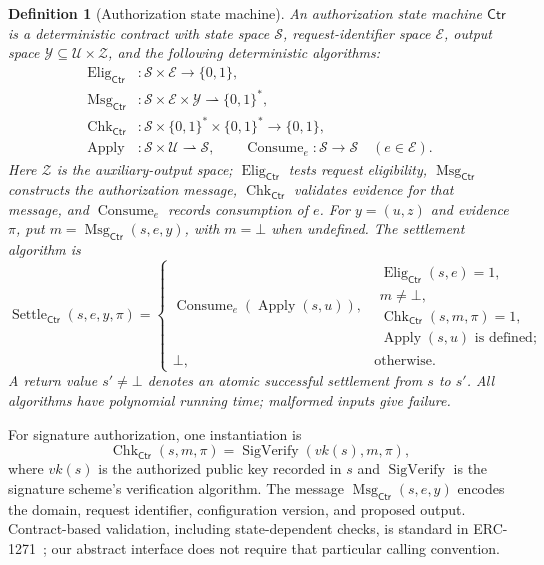 \documentclass[10pt,letterpaper]{article}
\newtheorem{definition}{Definition}
\newcommand{\Msg}{\operatorname{Msg}}
\newcommand{\Ctr}{\mathsf{Ctr}}
\begin{document}
\begin{definition}[Authorization state machine]
\label{def:auth-machine}
An authorization state machine $\Ctr$ is a deterministic contract with state space $\mathcal S$, request-identifier space $\mathcal E$, output space $\mathcal Y\subseteq\mathcal U\times\mathcal Z$, and the following deterministic algorithms:
\begin{align*}
 \operatorname{Elig}_{\Ctr}&:\mathcal S\times\mathcal E\to\{0,1\},\\
 \Msg_{\Ctr}&:\mathcal S\times\mathcal E\times\mathcal Y\rightharpoonup\{0,1\}^*,\\
 \operatorname{Chk}_{\Ctr}&:\mathcal S\times\{0,1\}^*\times\{0,1\}^*\to\{0,1\},\\
 \operatorname{Apply}&:\mathcal S\times\mathcal U\rightharpoonup\mathcal S,\qquad
 \operatorname{Consume}_e:\mathcal S\to\mathcal S\quad(e\in\mathcal E).
\end{align*}
Here $\mathcal Z$ is the auxiliary-output space; $\operatorname{Elig}_{\Ctr}$ tests request eligibility, $\Msg_{\Ctr}$ constructs the authorization message, $\operatorname{Chk}_{\Ctr}$ validates evidence for that message, and $\operatorname{Consume}_e$ records consumption of $e$. For $y=(u,z)$ and evidence $\pi$, put $m=\Msg_{\Ctr}(s,e,y)$, with $m=\bot$ when undefined. The settlement algorithm is
\[
 \operatorname{Settle}_{\Ctr}(s,e,y,\pi)=
 \begin{cases}
 \operatorname{Consume}_e(\operatorname{Apply}(s,u)),&
 \begin{array}{l}
 \operatorname{Elig}_{\Ctr}(s,e)=1,\\
 m\ne\bot,\\
 \operatorname{Chk}_{\Ctr}(s,m,\pi)=1,\\
 \operatorname{Apply}(s,u)\text{ is defined};
 \end{array}\\[2pt]
 \bot,&\text{otherwise}.
 \end{cases}
\]
A return value $s'\ne\bot$ denotes an atomic successful settlement from $s$ to $s'$. All algorithms have polynomial running time; malformed inputs give failure.
\end{definition}

For signature authorization, one instantiation is
\[
 \operatorname{Chk}_{\Ctr}(s,m,\pi)=\operatorname{SigVerify}(vk(s),m,\pi),
\]
where $vk(s)$ is the authorized public key recorded in $s$ and $\operatorname{SigVerify}$ is the signature scheme's verification algorithm. The message $\Msg_{\Ctr}(s,e,y)$ encodes the domain, request identifier, configuration version, and proposed output. Contract-based validation, including state-dependent checks, is standard in ERC-1271~\citep{erc1271}; our abstract interface does not require that particular calling convention.
\end{document}
